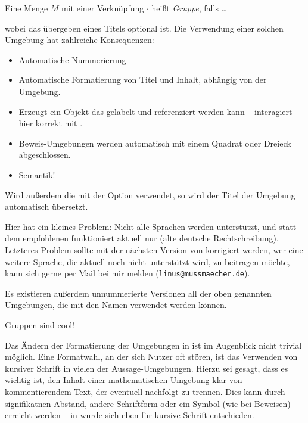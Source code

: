 \begin{latexlisting}
	\begin{definition}[Gruppe]
		Eine Menge $M$ mit einer Verknüpfung $\cdot$ heißt \emph{Gruppe}, falls \dots
	\end{definition}
\end{latexlisting}
wobei das übergeben eines Titels optional ist.
Die Verwendung einer solchen Umgebung hat zahlreiche Konsequenzen:
\begin{itemize}
	\item Automatische Nummerierung
	\item Automatische Formatierung von Titel und Inhalt, abhängig von der Umgebung.
	\item Erzeugt ein Objekt das gelabelt und referenziert werden kann --  interagiert hier korrekt mit .
	\item Beweis-Umgebungen werden automatisch mit einem Quadrat oder Dreieck abgeschlossen.
	\item Semantik!
\end{itemize}
Wird außerdem die  mit der Option  verwendet, so wird der Titel der Umgebung automatisch übersetzt.
\begin{latexlisting}
	\usepackage[german,string]{babel}
	\usepackage{nchairx}
\end{latexlisting}
Hier hat  ein kleines Problem:
Nicht alle Sprachen werden unterstützt, und statt dem empfohlenen  funktioniert aktuell nur  (alte deutsche Rechtschreibung).
Letzteres Problem sollte mit der nächsten Version von  korrigiert werden, wer eine weitere Sprache, die aktuell noch nicht unterstützt wird, zu  beitragen möchte, kann sich gerne per Mail bei mir melden (\texttt{linus@mussmaecher.de}).

Es existieren außerdem unnummerierte Versionen all der oben genannten Umgebungen, die mit den Namen  verwendet werden können.
\begin{latexlisting}
	\begin{nnremark}
		Gruppen sind cool!
	\end{nnremark}
\end{latexlisting}
Das Ändern der Formatierung der Umgebungen in  ist im Augenblick nicht trivial möglich.
Eine Formatwahl, an der sich Nutzer oft stören, ist das Verwenden von kursiver Schrift in vielen der Aussage-Umgebungen.
Hierzu sei gesagt, dass es wichtig ist, den Inhalt einer mathematischen Umgebung klar von kommentierendem Text, der eventuell nachfolgt zu trennen.
Dies kann durch signifikatnen Abstand, andere Schriftform oder ein Symbol (wie bei Beweisen) erreicht werden -- in  wurde sich eben für kursive Schrift entschieden.

